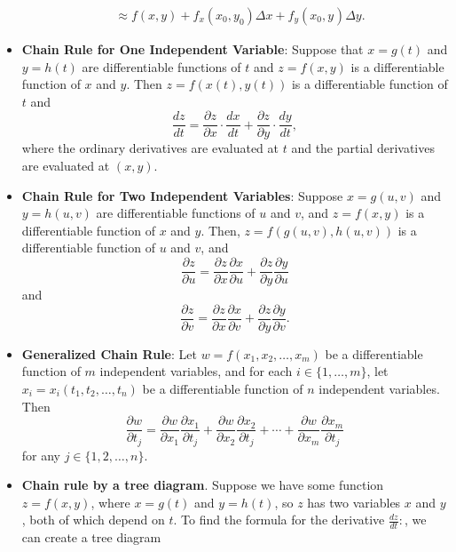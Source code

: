 \documentclass{report}
\begin{document}
\begin{itemize}
\begin{align*}
            &\approx f(x,y) +f_{x}(x_{0},y_{0})\Delta x + f_{y}(x_{0}, y_{})\Delta y
        .\end{align*}
    \item \textbf{Chain Rule for One Independent Variable}:
        Suppose that \(x = g(t)\) and \(y = h(t)\) are differentiable functions of \(t\) and \(z = f(x,y)\) is a differentiable function of \(x\) and \(y\). Then \(z = f(x(t), y(t))\) is a differentiable function of \(t\) and
        \[
            \frac{dz}{dt} = \frac{\partial z}{\partial x} \cdot \frac{dx}{dt} + \frac{\partial z}{\partial y} \cdot \frac{dy}{dt},
        \]
        where the ordinary derivatives are evaluated at \(t\) and the partial derivatives are evaluated at \((x,y)\).
    \item \textbf{Chain Rule for Two Independent Variables}:
        Suppose \(x = g(u,v)\) and \(y = h(u,v)\) are differentiable functions of \(u\) and \(v\), and \(z = f(x,y)\) is a differentiable function of \(x\) and \(y\). Then, \(z = f(g(u,v),h(u,v))\) is a differentiable function of \(u\) and \(v\), and
        \[
            \frac{\partial z}{\partial u} = \frac{\partial z}{\partial x} \frac{\partial x}{\partial u} + \frac{\partial z}{\partial y} \frac{\partial y}{\partial u}
        \]
        and
        \[
            \frac{\partial z}{\partial v} = \frac{\partial z}{\partial x} \frac{\partial x}{\partial v} + \frac{\partial z}{\partial y} \frac{\partial y}{\partial v}.
        \]
    \item \textbf{Generalized Chain Rule}:
        Let \(w = f(x_1, x_2, \ldots, x_m)\) be a differentiable function of \(m\) independent variables, and for each \(i \in \{1, \ldots, m\}\), let \(x_i = x_i(t_1, t_2, \ldots, t_n)\) be a differentiable function of \(n\) independent variables. Then
        \[
            \frac{\partial w}{\partial t_j} = \frac{\partial w}{\partial x_1} \frac{\partial x_1}{\partial t_j} + \frac{\partial w}{\partial x_2} \frac{\partial x_2}{\partial t_j} + \cdots + \frac{\partial w}{\partial x_m} \frac{\partial x_m}{\partial t_j}
        \]
        for any \(j \in \{1, 2, \ldots, n\}\).
    \item \textbf{Chain rule by a tree diagram}. Suppose we have some function $z=f(x,y)$, where $x=g(t)$ and $y=h(t)$, so $z$ has two variables $x$ and $y$, both of which depend on $t$. To find the formula for the derivative $\frac{dz}{dt}:$, we can create a tree diagram
        \bigbreak \noindent 
    \begin{figure}[ht]
        \centering
        \label{fig:tree}

\end{figure}
\end{itemize}
\end{document}
